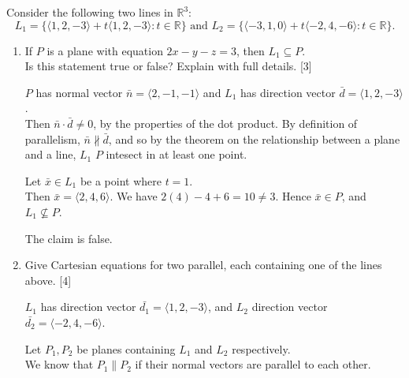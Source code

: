 \documentclass[11pt]{article}
\begin{document}
Consider the following two lines in \(\mathbb{R}^3\):
    \[
        L_1 = \{\langle1,2,-3\rangle + t\langle1,2,-3\rangle : t \in \mathbb{R}\}
        \text{ and }
        L_2 = \{\langle-3,1,0\rangle + t\langle-2,4,-6\rangle : t \in \mathbb{R}\}.
    \]
\begin{enumerate}[label=\alph*), series=Last]
    \item If \(P\) is a plane with equation \(2x-y-z=3\), then \(L_1 \subseteq P\).\\
    Is this statement true or false? Explain with full details. \hfill [3]

    \color{blue}
    \(P\) has normal vector \(\bar{n} = \langle 2,-1,-1\rangle\) and \(L_1\) has direction vector \(\bar{d} = \langle 1,2,-3\rangle\).\\
    Then \(\bar{n} \cdot \bar{d} \neq 0\), by the properties of the dot product. By definition of parallelism, \(\bar{n} \nparallel  \bar{d}\), and
    so by the theorem on the relationship between a plane and a line, \(L_1\) \(P\) intesect in at least one point.

    Let \(\bar{x} \in L_1\) be a point where \(t = 1\).\\
    Then \(\bar{x} = \langle2,4,6\rangle.\)
    We have \( 2(4) -4 + 6 = 10 \neq 3\). Hence \(\bar{x} \in P\), and \(L_1 \nsubseteq P\).

    The claim is false.

    \color{black}

    \item Give Cartesian equations for two parallel, each containing one of the lines above. \hfill [4]
    \color{blue}

    \(L_1\) has direction vector \(\bar{d_1} = \langle1,2,-3\rangle\), and \(L_2\) direction vector \(\bar{d_2} = \langle-2,4,-6\rangle\).

    Let \(P_1,P_2\) be planes containing \(L_1\) and \(L_2\) respectively.\\
    We know that \(P_1\parallel P_2\) if their normal vectors are parallel to each other.

    \vspace{1em}


\end{enumerate}
\end{document}

